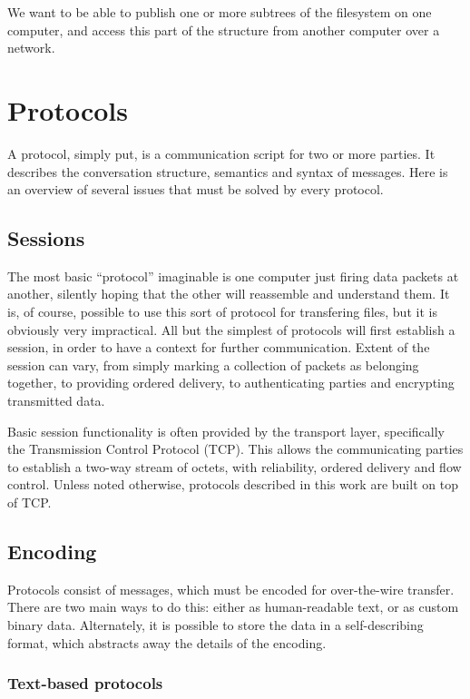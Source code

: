 We want to be able to publish one or more subtrees of the filesystem on one computer, and access this part of
the structure from another computer over a network.


\section{Protocols}

A protocol, simply put, is a communication script for two or more parties. It describes the conversation
structure, semantics and syntax of messages. Here is an overview of several issues that must be solved by
every protocol.


\subsection{Sessions}

The most basic ``protocol'' imaginable is one computer just firing data packets at another, silently hoping
that the other will reassemble and understand them. It is, of course, possible to use this sort of protocol
for transfering files, but it is obviously very impractical. All but the simplest of protocols will first
establish a session, in order to have a context for further communication. Extent of the session can vary,
from simply marking a collection of packets as belonging together, to providing ordered delivery, to
authenticating parties and encrypting transmitted data.

Basic session functionality is often provided by the transport layer, specifically the Transmission Control
Protocol (TCP). This allows the communicating parties to establish a two-way stream of octets, with
reliability, ordered delivery and flow control. Unless noted otherwise, protocols described in this work are
built on top of TCP.


\subsection{Encoding}

Protocols consist of messages, which must be encoded for over-the-wire transfer. There are two main ways to do
this: either as human-readable text, or as custom binary data. Alternately, it is possible to store the data
in a self-describing format, which abstracts away the details of the encoding.

\subsubsection{Text-based protocols}

